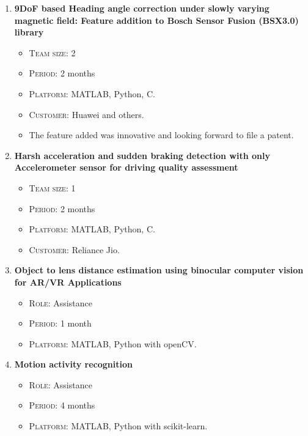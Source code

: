 \documentclass[11pt,a4paper,sans]{moderncv} %
\begin{document}
{\begin{enumerate}
\item \textbf{9DoF based Heading angle correction under slowly varying magnetic field: Feature addition to Bosch Sensor Fusion (BSX3.0) library}
\begin{itemize}
\item \textsc{Team size:} 2
\item \textsc{Period:} 2 months
\item \textsc{Platform:} MATLAB, Python, C. 
\item \textsc{Customer:} Huawei and others.
\item The feature added was innovative and looking forward to file a patent. 
\end{itemize}
\item \textbf{Harsh acceleration and sudden braking detection with only Accelerometer sensor for driving quality assessment}
\begin{itemize}
\item \textsc{Team size:} 1
\item \textsc{Period:} 2 months
\item \textsc{Platform:} MATLAB, Python, C. 
\item \textsc{Customer:} Reliance Jio. 
\end{itemize}
\item \textbf{Object to lens distance estimation using binocular computer vision for AR/VR Applications}
\begin{itemize}
\item \textsc{Role:} Assistance
\item \textsc{Period:} 1 month
\item \textsc{Platform:} MATLAB, Python with openCV. 
\end{itemize}
\item \textbf{Motion activity recognition}
\begin{itemize}
\item \textsc{Role:} Assistance
\item \textsc{Period:} 4 months
\item \textsc{Platform:} MATLAB, Python with scikit-learn. 
\end{itemize}
\end{enumerate}}

\end{document}
